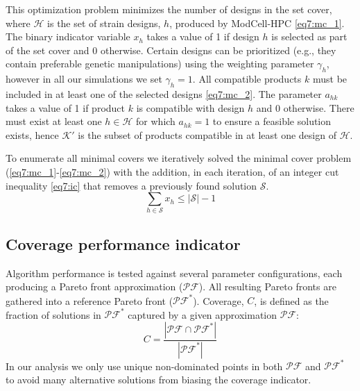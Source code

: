 \documentclass[12pt]{article}
\newcommand\PF{\mathcal{PF}}
\newcommand\PFs{\mathcal{PF}^*}
\begin{document}
{This optimization problem minimizes the number of designs in the set cover, where $\mathcal{H}$ is the set of strain designs, $h$, produced by ModCell-HPC \eqref{eq7:mc_1}.
The binary indicator variable $x_h$ takes a value of 1 if design $h$ is selected as part of the set cover and 0 otherwise.
Certain designs can be prioritized (e.g., they contain preferable genetic manipulations) using the weighting parameter $\gamma_h$, however in all our simulations we set $\gamma_h = 1$. All compatible products $k$ must be included in at least one of the selected designs \eqref{eq7:mc_2}. The parameter $a_{hk}$ takes a value of 1 if product $k$ is compatible with design $h$ and 0 otherwise. There must exist at least one $h \in \mathcal{H}$ for which $a_{hk} = 1$ to ensure a feasible solution exists, hence $\mathcal{K'}$ is the subset of products compatible in at least one design of $\mathcal{H}$.

To enumerate all minimal covers we iteratively solved the minimal cover problem (\ref{eq7:mc_1}-\ref{eq7:mc_2}) with the addition, in each iteration, of an integer cut inequality \eqref{eq7:ic} that removes a previously found solution $\mathcal{S}$.
\begin{equation}
    \sum_{h\in\mathcal{S}} x_h \le |\mathcal{S}|  - 1 \label{eq7:ic}
\end{equation}

\subsection{Coverage performance indicator} \label{sec:coverage_metric}
Algorithm performance is tested against several parameter configurations, each producing a Pareto front approximation ($\PF$). All resulting Pareto fronts are gathered into a reference Pareto front ($\PFs$).
Coverage, $C$, is defined as the fraction of solutions in $\PFs$ captured by a given approximation $\PF$:
\begin{equation}
    C = \frac{|\PF \cap \PFs|}{|\PFs|}
\end{equation}
In our analysis we only use unique non-dominated points in both $\PF$ and $\PFs$ to avoid many alternative solutions from biasing the coverage indicator.

}
\end{document}
